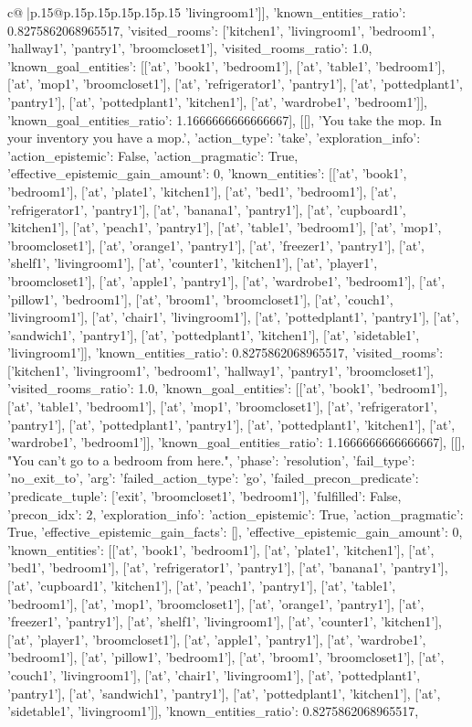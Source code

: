 \documentclass{article}
\begin{document}
{\begin{supertabular}{c@{$\;$}|p{.15\linewidth}@{}p{.15\linewidth}p{.15\linewidth}p{.15\linewidth}p{.15\linewidth}p{.15\linewidth}}
{{{'livingroom1']], 'known_entities_ratio': 0.8275862068965517, 'visited_rooms': ['kitchen1', 'livingroom1', 'bedroom1', 'hallway1', 'pantry1', 'broomcloset1'], 'visited_rooms_ratio': 1.0, 'known_goal_entities': [['at', 'book1', 'bedroom1'], ['at', 'table1', 'bedroom1'], ['at', 'mop1', 'broomcloset1'], ['at', 'refrigerator1', 'pantry1'], ['at', 'pottedplant1', 'pantry1'], ['at', 'pottedplant1', 'kitchen1'], ['at', 'wardrobe1', 'bedroom1']], 'known_goal_entities_ratio': 1.1666666666666667}}], [[], 'You take the mop. In your inventory you have a mop.', {'action_type': 'take', 'exploration_info': {'action_epistemic': False, 'action_pragmatic': True, 'effective_epistemic_gain_amount': 0, 'known_entities': [['at', 'book1', 'bedroom1'], ['at', 'plate1', 'kitchen1'], ['at', 'bed1', 'bedroom1'], ['at', 'refrigerator1', 'pantry1'], ['at', 'banana1', 'pantry1'], ['at', 'cupboard1', 'kitchen1'], ['at', 'peach1', 'pantry1'], ['at', 'table1', 'bedroom1'], ['at', 'mop1', 'broomcloset1'], ['at', 'orange1', 'pantry1'], ['at', 'freezer1', 'pantry1'], ['at', 'shelf1', 'livingroom1'], ['at', 'counter1', 'kitchen1'], ['at', 'player1', 'broomcloset1'], ['at', 'apple1', 'pantry1'], ['at', 'wardrobe1', 'bedroom1'], ['at', 'pillow1', 'bedroom1'], ['at', 'broom1', 'broomcloset1'], ['at', 'couch1', 'livingroom1'], ['at', 'chair1', 'livingroom1'], ['at', 'pottedplant1', 'pantry1'], ['at', 'sandwich1', 'pantry1'], ['at', 'pottedplant1', 'kitchen1'], ['at', 'sidetable1', 'livingroom1']], 'known_entities_ratio': 0.8275862068965517, 'visited_rooms': ['kitchen1', 'livingroom1', 'bedroom1', 'hallway1', 'pantry1', 'broomcloset1'], 'visited_rooms_ratio': 1.0, 'known_goal_entities': [['at', 'book1', 'bedroom1'], ['at', 'table1', 'bedroom1'], ['at', 'mop1', 'broomcloset1'], ['at', 'refrigerator1', 'pantry1'], ['at', 'pottedplant1', 'pantry1'], ['at', 'pottedplant1', 'kitchen1'], ['at', 'wardrobe1', 'bedroom1']], 'known_goal_entities_ratio': 1.1666666666666667}}], [[], "You can't go to a bedroom from here.", {'phase': 'resolution', 'fail_type': 'no_exit_to', 'arg': {'failed_action_type': 'go', 'failed_precon_predicate': {'predicate_tuple': ['exit', 'broomcloset1', 'bedroom1'], 'fulfilled': False, 'precon_idx': 2}}, 'exploration_info': {'action_epistemic': True, 'action_pragmatic': True, 'effective_epistemic_gain_facts': [], 'effective_epistemic_gain_amount': 0, 'known_entities': [['at', 'book1', 'bedroom1'], ['at', 'plate1', 'kitchen1'], ['at', 'bed1', 'bedroom1'], ['at', 'refrigerator1', 'pantry1'], ['at', 'banana1', 'pantry1'], ['at', 'cupboard1', 'kitchen1'], ['at', 'peach1', 'pantry1'], ['at', 'table1', 'bedroom1'], ['at', 'mop1', 'broomcloset1'], ['at', 'orange1', 'pantry1'], ['at', 'freezer1', 'pantry1'], ['at', 'shelf1', 'livingroom1'], ['at', 'counter1', 'kitchen1'], ['at', 'player1', 'broomcloset1'], ['at', 'apple1', 'pantry1'], ['at', 'wardrobe1', 'bedroom1'], ['at', 'pillow1', 'bedroom1'], ['at', 'broom1', 'broomcloset1'], ['at', 'couch1', 'livingroom1'], ['at', 'chair1', 'livingroom1'], ['at', 'pottedplant1', 'pantry1'], ['at', 'sandwich1', 'pantry1'], ['at', 'pottedplant1', 'kitchen1'], ['at', 'sidetable1', 'livingroom1']], 'known_entities_ratio': 0.8275862068965517, }}}
\end{supertabular}}
\end{document}
